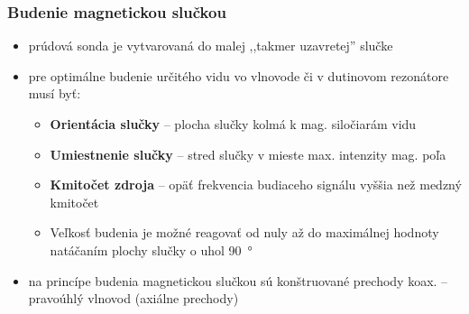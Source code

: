 	\subsubsection{Budenie magnetickou slučkou}
	\begin{itemize}[label=--]
		\item prúdová sonda je vytvarovaná do malej ,,takmer uzavretej'' slučke
		\item pre optimálne budenie určitého vidu vo vlnovode či v dutinovom rezonátore musí byť:
		\begin{itemize}[label=$\rightarrow$]
			\item \textbf{Orientácia slučky} -- plocha slučky kolmá k mag. siločiarám vidu
			\item \textbf{Umiestnenie slučky} -- stred slučky v mieste max. intenzity mag. poľa
			\item \textbf{Kmitočet zdroja} -- opäť frekvencia budiaceho signálu vyššia než medzný kmitočet
			\item Veľkosť budenia je možné reagovať od nuly až do maximálnej hodnoty natáčaním plochy slučky o uhol \qty{90}{\degree}
		\end{itemize}
		\item na princípe budenia magnetickou slučkou sú konštruované prechody koax. -- pravoúhlý vlnovod (axiálne prechody)
	\end{itemize}
	
